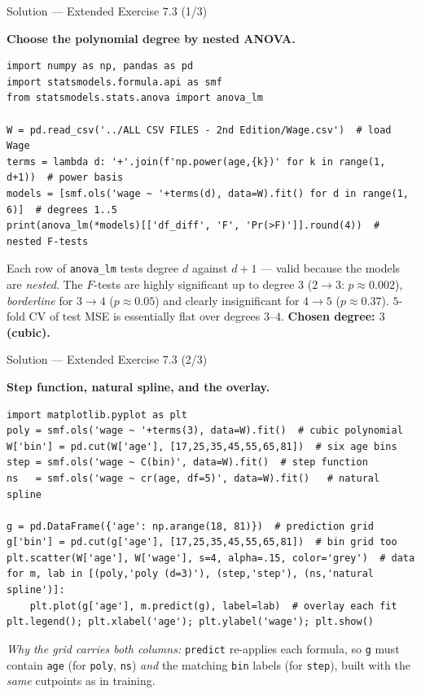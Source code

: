 \documentclass[aspectratio=169,11pt]{beamer}
\begin{document}
\begin{frame}[fragile]{Solution --- Extended Exercise 7.3 (1/3)}
\begin{solutionbox}
\textbf{Choose the polynomial degree by nested ANOVA.}
\begin{lstlisting}[basicstyle=\ttfamily\scriptsize]
import numpy as np, pandas as pd
import statsmodels.formula.api as smf
from statsmodels.stats.anova import anova_lm

W = pd.read_csv('../ALL CSV FILES - 2nd Edition/Wage.csv')  # load Wage
terms = lambda d: '+'.join(f'np.power(age,{k})' for k in range(1, d+1))  # power basis
models = [smf.ols('wage ~ '+terms(d), data=W).fit() for d in range(1, 6)]  # degrees 1..5
print(anova_lm(*models)[['df_diff', 'F', 'Pr(>F)']].round(4))  # nested F-tests
\end{lstlisting}
Each row of \texttt{anova\_lm} tests degree $d$ against $d{+}1$ --- valid because the models are \emph{nested}. The $F$-tests are highly significant up to degree $3$ ($2\!\to\!3$: $p\approx0.002$), \emph{borderline} for $3\!\to\!4$ ($p\approx0.05$) and clearly insignificant for $4\!\to\!5$ ($p\approx0.37$). $5$-fold CV of test MSE is essentially flat over degrees $3$--$4$. \textbf{Chosen degree: $3$ (cubic).}
\end{solutionbox}
\end{frame}

\begin{frame}[fragile]{Solution --- Extended Exercise 7.3 (2/3)}
\begin{solutionbox}
\textbf{Step function, natural spline, and the overlay.}
\begin{lstlisting}[basicstyle=\ttfamily\scriptsize]
import matplotlib.pyplot as plt
poly = smf.ols('wage ~ '+terms(3), data=W).fit()  # cubic polynomial
W['bin'] = pd.cut(W['age'], [17,25,35,45,55,65,81])  # six age bins
step = smf.ols('wage ~ C(bin)', data=W).fit()  # step function
ns   = smf.ols('wage ~ cr(age, df=5)', data=W).fit()   # natural spline

g = pd.DataFrame({'age': np.arange(18, 81)})  # prediction grid
g['bin'] = pd.cut(g['age'], [17,25,35,45,55,65,81])  # bin grid too
plt.scatter(W['age'], W['wage'], s=4, alpha=.15, color='grey')  # data
for m, lab in [(poly,'poly (d=3)'), (step,'step'), (ns,'natural spline')]:
    plt.plot(g['age'], m.predict(g), label=lab)  # overlay each fit
plt.legend(); plt.xlabel('age'); plt.ylabel('wage'); plt.show()
\end{lstlisting}
\emph{Why the grid carries both columns:} \texttt{predict} re-applies each formula, so \texttt{g} must contain \texttt{age} (for \texttt{poly}, \texttt{ns}) \emph{and} the matching \texttt{bin} labels (for \texttt{step}), built with the \emph{same} cutpoints as in training.
\end{solutionbox}
\end{frame}
\end{document}
